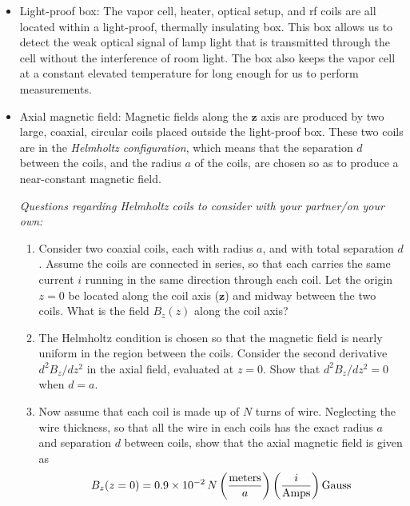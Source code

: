 \documentclass{../lab}
\begin{document}
\begin{itemize}
    \item{} Light-proof box:  The vapor cell, heater, optical setup, and rf coils are all located within a light-proof, thermally insulating box.  This box allows us to detect the weak optical signal of lamp light that is transmitted through the cell without the interference of room light. The box also keeps the  vapor cell at a constant elevated temperature for long enough for us to perform measurements.
    
    \item{} Axial magnetic field:  Magnetic fields along the $\mathbf{z}$ axis are produced by two large, coaxial, circular coils placed outside the light-proof box.  These two coils are in the \emph{Helmholtz configuration}, which means that the separation $d$ between the coils, and the radius $a$ of the coils, are chosen so as to produce a near-constant magnetic field.
    
    \emph{Questions regarding Helmholtz coils to consider with your partner/on your own:}
    \begin{enumerate}[resume=forstudents, label=Q\arabic*.]%
    \item{} Consider two coaxial coils, each with radius $a$, and with total separation $d$.  Assume the coils are connected in series, so that each carries the same current $i$ running in the same direction through each coil.  Let the origin $z=0$ be located along the coil axis ($\mathbf{z}$) and midway between the two coils.  What is the field $B_z(z)$ along the coil axis?
    \item{} The Helmholtz condition is chosen so that the magnetic field is nearly uniform in the region between the coils.  Consider the second derivative $d^2 B_z / dz^2$ in the axial field, evaluated at $z=0$.  Show that $d^2 B_z / dz^2 = 0$ when $d=a$.
    
    \item{} Now assume that each coil is made up of $N$ turns of wire.  Neglecting the wire thickness, so that all the wire in each coils has the exact radius $a$ and separation $d$ between coils, show that the axial magnetic field is given as
        \begin{equation}
         B_z(z=0)=0.9 \times 10^{-2} \, N \left(\frac{\rm meters}{a}\right)  \left(\frac{i}{\rm Amps}\right) {\rm Gauss}
        \label{eq:helmholtz}
    \end{equation}
    

\end{enumerate}
\end{itemize}
\end{document}
